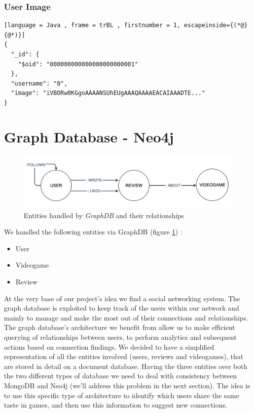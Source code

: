 \subsubsection{User Image}
\begin{lstlisting}[language = Java , frame = trBL , firstnumber = 1, escapeinside={(*@}{@*)}]
{
  "_id": {
    "$oid": "000000000000000000000001"
  },
  "username": "0",
  "image": "iVBORw0KGgoAAAANSUhEUgAAAQAAAAEACAIAAADTE..."
}
\end{lstlisting}
\section{Graph Database - Neo4j}
\begin{figure}[hbt!]
	\centering
	\includegraphics[width=1\textwidth]{chapter3/img/graph.png}
	\caption{Entities handled by \emph{GraphDB} and their relationships}
	\label{fig:graph}
\end{figure}
We handled the following entities via GraphDB (figure \ref{fig:graph}) :
\begin{itemize}
	\item User
	\item Videogame
	\item Review
\end{itemize}
At the very base of our project’s idea we find a social networking system. 
The graph database is exploited to keep track of the users within our network and mainly to manage and make the most out of their connections and relationships.
The graph database’s architecture we benefit from allow us to make efficient querying of relationships between users, to perform analytics and subsequent actions based on connection findings.
We decided to have a simplified representation of all the entities involved (users, reviews and videogames), that are stored in detail on a document database. Having the three entities over both the two different types of database we need to deal with consistency between MongoDB and Neo4j (we'll address this problem in the next section). 
The idea is to use this specific type of architecture to identify which users share the same taste in games, and then use this information to suggest new connections. 

